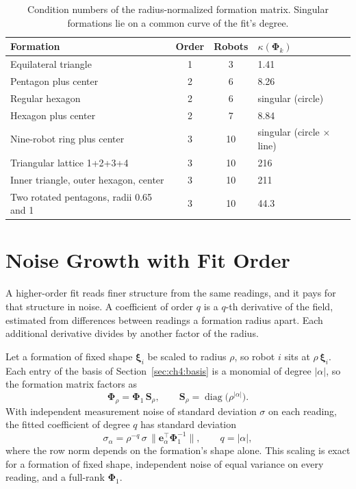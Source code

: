 \begin{table}[htbp]
\centering
\caption{Condition numbers of the radius-normalized formation matrix.
Singular formations lie on a common curve of the fit's degree.}
\label{tab:ch8:geometry}
\small
\begin{tabular}{lccl}
\hline
Formation & Order & Robots & $\kappa(\boldsymbol{\Phi}_k)$ \\
\hline
Equilateral triangle & 1 & 3 & 1.41 \\
Pentagon plus center & 2 & 6 & 8.26 \\
Regular hexagon & 2 & 6 & singular (circle) \\
Hexagon plus center & 2 & 7 & 8.84 \\
Nine-robot ring plus center & 3 & 10 & singular (circle $\times$ line) \\
Triangular lattice 1+2+3+4 & 3 & 10 & 216 \\
Inner triangle, outer hexagon, center & 3 & 10 & 211 \\
Two rotated pentagons, radii 0.65 and 1 & 3 & 10 & 44.3 \\
\hline
\end{tabular}
\end{table}

\section{Noise Growth with Fit Order}
\label{sec:ch8:noise_order}

A higher-order fit reads finer structure from the same readings, and it
pays for that structure in noise. A coefficient of order $q$ is a $q$-th
derivative of the field, estimated from differences between readings a
formation radius apart. Each additional derivative divides by another
factor of the radius.

Let a formation of fixed shape $\boldsymbol{\xi}_i$ be scaled to radius
$\rho$, so robot $i$ sits at $\rho\,\boldsymbol{\xi}_i$. Each entry of the
basis of Section~\ref{sec:ch4:basis} is a monomial of degree $|\alpha|$,
so the formation matrix factors as
\begin{equation}
    \boldsymbol{\Phi}_\rho = \boldsymbol{\Phi}_1\,\mathbf{S}_\rho, \qquad
    \mathbf{S}_\rho = \operatorname{diag}\bigl(\rho^{|\alpha|}\bigr).
    \label{eq:ch8:phi_scaling}
\end{equation}
With independent measurement noise of standard deviation $\sigma$ on each
reading, the fitted coefficient of degree $q$ has standard deviation
\begin{equation}
    \sigma_{\alpha} = \rho^{-q}\,\sigma\,
        \bigl\lVert \mathbf{e}_\alpha^{\top}\boldsymbol{\Phi}_1^{-1}\bigr\rVert,
    \qquad q = |\alpha|,
    \label{eq:ch8:coef_noise}
\end{equation}
where the row norm depends on the formation's shape alone. This scaling is
exact for a formation of fixed shape, independent noise of equal variance
on every reading, and a full-rank $\boldsymbol{\Phi}_1$.

